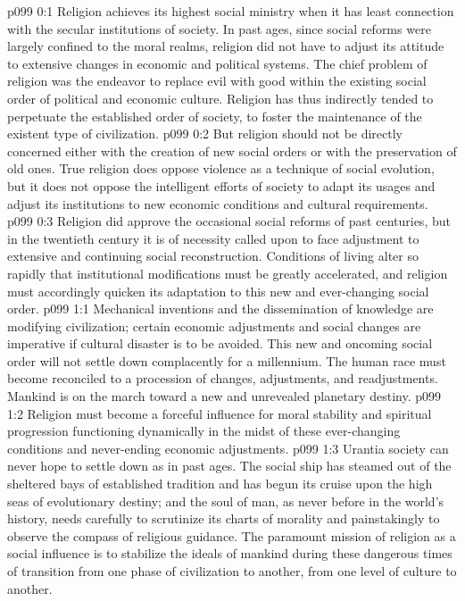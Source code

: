 \author{Melchizedek}
\vs p099 0:1 Religion achieves its highest social ministry when it has least connection with the secular institutions of society. In past ages, since social reforms were largely confined to the moral realms, religion did not have to adjust its attitude to extensive changes in economic and political systems. The chief problem of religion was the endeavor to replace evil with good within the existing social order of political and economic culture. Religion has thus indirectly tended to perpetuate the established order of society, to foster the maintenance of the existent type of civilization.
\vs p099 0:2 But religion should not be directly concerned either with the creation of new social orders or with the preservation of old ones. True religion does oppose violence as a technique of social evolution, but it does not oppose the intelligent efforts of society to adapt its usages and adjust its institutions to new economic conditions and cultural requirements.
\vs p099 0:3 Religion did approve the occasional social reforms of past centuries, but in the twentieth century it is of necessity called upon to face adjustment to extensive and continuing social reconstruction. Conditions of living alter so rapidly that institutional modifications must be greatly accelerated, and religion must accordingly quicken its adaptation to this new and ever\hyp{}changing social order.
%
\vs p099 1:1 Mechanical inventions and the dissemination of knowledge are modifying civilization; certain economic adjustments and social changes are imperative if cultural disaster is to be avoided. This new and oncoming social order will not settle down complacently for a millennium. The human race must become reconciled to a procession of changes, adjustments, and readjustments. Mankind is on the march toward a new and unrevealed planetary destiny.
\pc \vs p099 1:2 Religion must become a forceful influence for moral stability and spiritual progression functioning dynamically in the midst of these ever\hyp{}changing conditions and never\hyp{}ending economic adjustments.
\pc \vs p099 1:3 Urantia society can never hope to settle down as in past ages. The social ship has steamed out of the sheltered bays of established tradition and has begun its cruise upon the high seas of evolutionary destiny; and the soul of man, as never before in the world’s history, needs carefully to scrutinize its charts of morality and painstakingly to observe the compass of religious guidance. The paramount mission of religion as a social influence is to stabilize the ideals of mankind during these dangerous times of transition from one phase of civilization to another, from one level of culture to another.\plusone
